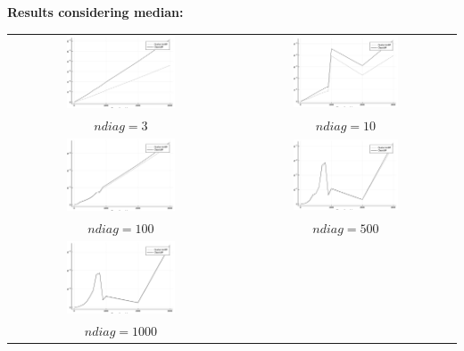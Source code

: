 \documentclass[a4paper,11pt]{article}
\begin{document}
\bf{Results considering median:}\\

\begin{tabular}{cc}
	\includegraphics[width=0.5\textwidth]{perf_median_3} & 
	\includegraphics[width=0.5\textwidth]{perf_median_10} \\
	$ndiag = 3$ & $ndiag = 10$\\
	\includegraphics[width=0.5\textwidth]{perf_median_100} &
	\includegraphics[width=0.5\textwidth]{perf_median_500} \\
	$ndiag = 100$ & $ndiag = 500$\\
	\includegraphics[width=0.5\textwidth]{perf_median_1000} & \\
	$ndiag = 1000$ & \\
\end{tabular}
\end{document}
